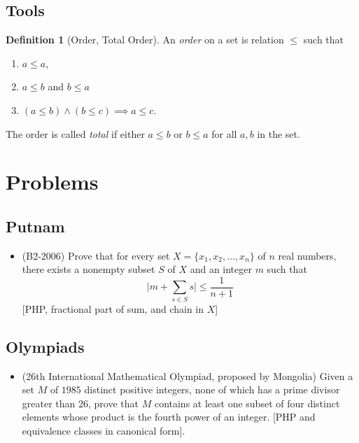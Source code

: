 \documentclass[12pt]{amsart}
\theoremstyle{definition}
\newtheorem{definition}[theorem]{Definition}
\begin{document}
\subsection{Tools}
\begin{definition}[Order, Total Order]
    An \emph{order} on a set is relation $\leq$ such that
    \begin{enumerate}
        \item $a\leq a$,
        \item $a\leq b$ and $b \leq a$
        \item $(a \leq b) \land (b \leq c) \implies a\leq c$.
    \end{enumerate}
        The order is called \emph{total} if either $a \leq
        b$ or $b \leq a$ for all $a,b$ in the set.
\end{definition}
\section{Problems}
\subsection{Putnam}
\begin{itemize}
\item (B2-2006) Prove that for every set $X = \{x_1, x_2, \dots, x_n\}$ of
    $n$ real numbers, there exists a nonempty subset $S$ of $X$ and an
    integer $m$ such that
    \begin{equation*}
        \big| m+\sum_{s\in S}s \big| \leq \frac{1}{n+1}
    \end{equation*}
    [PHP, fractional part of sum, and chain in $X$]
\end{itemize}
\subsection{Olympiads}
\begin{itemize}
    \item (26th International Mathematical Olympiad, proposed by Mongolia)
        Given a set $M$ of $1985$ distinct positive integers, none of which
        has a prime divisor greater than $26$, prove that $M$ contains at
        least one subset of four distinct elements whose product is the
        fourth power of an integer. [PHP and equivalence classes in
        canonical form].
\end{itemize}
\end{document}
